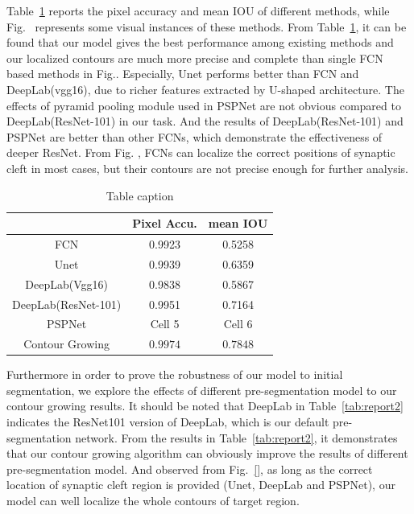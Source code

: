 Table~\ref{tab:report1} reports the pixel accuracy and mean IOU of different methods, while Fig.~ represents some visual instances of these methods.
From Table~\ref{tab:report1}, it can be found that our model gives the best performance among existing methods and our localized contours are much more precise and complete than single FCN based methods in Fig..
Especially, Unet performs better than FCN and DeepLab(vgg16), due to richer features extracted by U-shaped architecture.
The effects of pyramid pooling module used in PSPNet are not obvious compared to DeepLab(ResNet-101) in our task.
And the results of DeepLab(ResNet-101) and PSPNet are better than other FCNs, which demonstrate the effectiveness of deeper ResNet.
From Fig. , FCNs can localize the correct positions of synaptic cleft in most cases, but their contours are not precise enough for further analysis.

\begin{table}[t]
\begin{center}
\caption{Table caption} \label{tab:report1}
\begin{tabular}{|c|c|c|}
  \hline
   & Pixel Accu. & mean IOU
  \\
  \hline
  FCN & 0.9923 & 0.5258 \\
  Unet &  0.9939 & 0.6359 \\
  DeepLab(Vgg16) & 0.9838 & 0.5867 \\
  DeepLab(ResNet-101) & 0.9951 & 0.7164 \\
  PSPNet & Cell 5 & Cell 6 \\
  Contour Growing & $\mathbf{0.9974}$ & $\mathbf{0.7848}$ \\
  \hline
\end{tabular}
\end{center}
\end{table}

Furthermore in order to prove the robustness of our model to initial segmentation, we explore the effects of different pre-segmentation model to our contour growing results.
It should be noted that DeepLab in Table~\ref{tab:report2} indicates the ResNet101 version of DeepLab, which is our default pre-segmentation network.
From the results in Table~\ref{tab:report2}, it demonstrates that our contour growing algorithm can obviously improve the results of different pre-segmentation model.
And observed from Fig.~\ref{}, as long as the correct location of synaptic cleft region is provided (Unet, DeepLab and PSPNet), our model can well localize the whole contours of target region.

